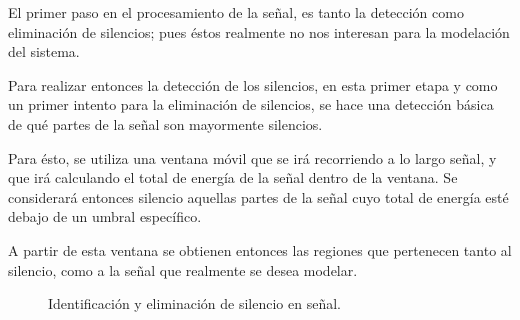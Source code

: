 El primer paso en el procesamiento de la señal, es tanto la detección como eliminación de silencios; pues éstos realmente no nos interesan para la modelación del sistema.


Para realizar entonces la detección de los silencios, en esta primer etapa y como un primer intento para la eliminación de silencios, se hace una detección básica de qué partes de la señal son mayormente silencios.

Para ésto, se utiliza una ventana móvil que se irá recorriendo a lo largo señal, y que irá calculando el total de energía de la señal dentro de la ventana. Se considerará entonces silencio aquellas partes de la señal cuyo total de energía esté debajo de un umbral específico.

A partir de esta ventana se obtienen entonces las regiones que pertenecen tanto al silencio, como a la señal que realmente se desea modelar.

\begin{figure}[bth]
  \myfloatalign
   \quad

   \quad
  
  \caption{Identificación y eliminación de silencio en señal.}  
  \label{fig:sign_trunc}  
\end{figure}


